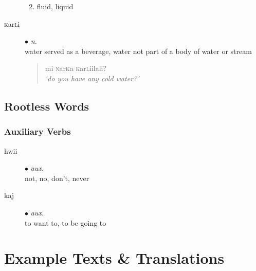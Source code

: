 \documentclass[a4paper,10pt,twoside,openright]{memoir}
\begin{document}
\begin{multicols*}{2}
\begin{description}
\begin{enumerate}
\begin{quote}
        \end{quote}
        \item fluid, liquid
        \begin{quote}
            
        \end{quote}
    \end{enumerate}
    \item[\textsc{k}ar\textsc{l}i] $\bullet$ \textit{n.}\hfill\\
        water served as a beverage, water not part of a body of water or stream
        \begin{quote}
            mi \textsc{n}ar\textsc{k}a \textsc{k}ar\textsc{l}iilali?\\
            \textit{`do you have any cold water?'}
        \end{quote}


\end{description}
\end{multicols*}

\chapter{Rootless Words}
\begin{multicols*}{2}
\section{Auxiliary Verbs}
\begin{description}
    \item[hwii] $\bullet$ \textit{aux.}\hfill\\
    not, no, don't, never
    \item[kaj] $\bullet$ \textit{aux.}\hfill\\
    to want to, to be going to 
\end{description}
\end{multicols*}

\part{Example Texts \& Translations}

\end{document}
